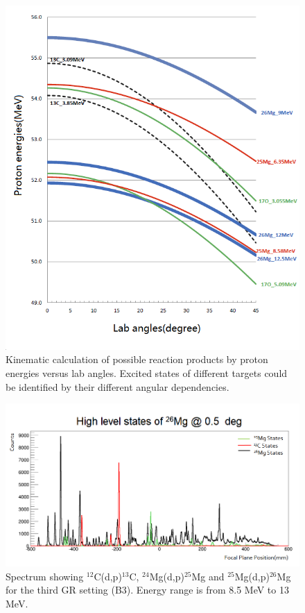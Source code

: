 \begin{figure}[tpb]
  \begin{center}
    \centerline{\includegraphics[scale=0.6]{graph/ch5/K}}
    \caption{Kinematic calculation of possible reaction products by proton energies versus  lab angles. Excited states of different targets could be identified by their different angular dependencies.}
    \label{fig:K}
  \end{center}
\end{figure}


\begin{figure}[tpb]
  \begin{center}
    \centerline{\includegraphics[scale=0.7]{graph/ch5/peaks}}
    \caption{Spectrum showing $^{12}$C(d,p)$^{13}$C, $^{24}$Mg(d,p)$^{25}$Mg and $^{25}$Mg(d,p)$^{26}$Mg for the third GR setting (B3). Energy range is from 8.5 MeV to 13 MeV.}
    \label{fig:peaks}
  \end{center}
\end{figure}

